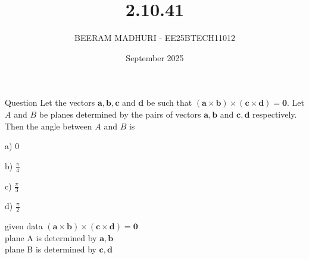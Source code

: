 \documentclass{beamer}
\title %
{2.10.41}
\date{September  2025}
\author %
{BEERAM MADHURI - EE25BTECH11012}
\begin{document}
\frame{\titlepage}
\begin{frame}{Question}
 Let the vectors $\mathbf{a}, \mathbf{b}, \mathbf{c}$ and $\mathbf{d}$ be such that $(\mathbf{a} \times \mathbf{b}) \times (\mathbf{c} \times \mathbf{d}) = \mathbf{0}$. Let $A$ and $B$ be planes determined by the pairs of vectors $\mathbf{a}, \mathbf{b}$ and $\mathbf{c}, \mathbf{d}$ respectively. Then the angle between $A$ and $B$ is

\begin{enumerate}
\begin{multicols}{4}
\item[a)] $0$
\item[b)] $\frac{\pi}{4}$
\item[c)] $\frac{\pi}{3}$
\item[d)] $\frac{\pi}{2}$
\end{multicols}
\end{enumerate}
 

\end{frame}
 
\begin{frame}{given data}
$(\mathbf{a} \times \mathbf{b}) \times (\mathbf{c} \times \mathbf{d}) = \mathbf{0}$\\
plane A is determined by $\mathbf{a}, \mathbf{b}$\\
plane B is determined by $\mathbf{c}, \mathbf{d}$
\end{frame}
 
\end{document}
